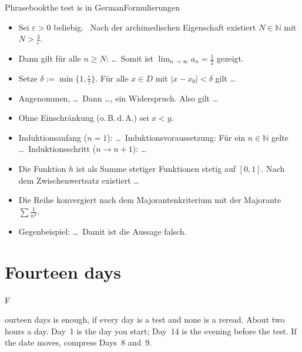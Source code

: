 \documentclass{kaelearn}
\newcommand\N{\mathbb N}
\newcommand\eps{\varepsilon}
\begin{document}
\begin{panel}[unbreakable]{Phrasebook}{the test is in German}{Formulierungen}
\begin{itemize}
  \item Sei $\eps>0$ beliebig. \ Nach der archimedischen Eigenschaft existiert $N\in\N$ mit $N>\frac3\eps$.
  \item Dann gilt für alle $n\ge N$: \dots \ Somit ist $\lim_{n\to\infty}a_n=\frac12$ gezeigt.
  \item Setze $\delta:=\min\{1,\frac\eps7\}$. Für alle $x\in D$ mit $|x-x_0|<\delta$ gilt \dots
  \item Angenommen, \dots\ Dann \dots, ein Widerspruch. Also gilt \dots
  \item Ohne Einschränkung (o.\,B.\,d.\,A.) sei $x<y$.
  \item Induktionsanfang ($n=1$): \dots \ Induktionsvoraussetzung: Für ein $n\in\N$ gelte \dots \ Induktionsschritt
        ($n\to n+1$): \dots
  \item Die Funktion $h$ ist als Summe stetiger Funktionen stetig auf $[0,1]$. Nach dem Zwischenwertsatz existiert \dots
  \item Die Reihe konvergiert nach dem Majorantenkriterium mit der Majorante $\sum\frac1{n^2}$.
  \item Gegenbeispiel: \dots\ Damit ist die Aussage falsch.
\end{itemize}
\end{panel}

\section{Fourteen days}

\opening{F}{ourteen days} is enough, if every day is a test and none is a reread. About two hours a day. Day~1 is the day you
start; Day~14 is the evening before the test. If the date moves, compress Days~8 and~9.
\end{document}
